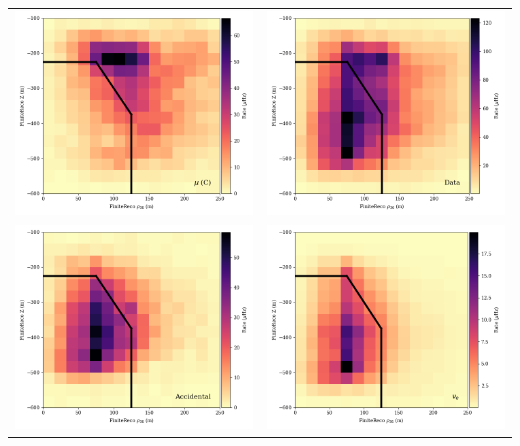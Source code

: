 \begin{center}
\begin{table}
\begin{tabular}{cc}
    \includegraphics[width=0.45\linewidth]{z_rho_corsika.png} &  
    \includegraphics[width=0.45\linewidth]{z_rho_data.png} \\  

    \includegraphics[width=0.45\linewidth]{z_rho_noise.png} &  
    \includegraphics[width=0.45\linewidth]{z_rho_genie_nue.png} \\  


\end{tabular}
\end{table}
\end{center}

